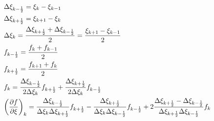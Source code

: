 \begin{equation*}
    \begin{split}
        &
        \Delta \xi_{k - \frac{1}{2}}
        =
        \xi_{k} - \xi_{k - 1}
        \\
        &
        \Delta \xi_{k + \frac{1}{2}}
        =
        \xi_{k + 1} - \xi_{k}
        \\
        &
        \Delta \xi_{k}
        =
        \frac
            {\Delta \xi_{k + \frac{1}{2}} + \Delta \xi_{k - \frac{1}{2}}}
            {2}
        =
        \frac
            {\xi_{k+1} - \xi_{k-1}}
            {2}
        \\
        &
        f_{k - \frac{1}{2}}
        =
        \frac
            {f_{k} + f_{k - 1}}
            {2}
        \\
        &
        f_{k + \frac{1}{2}}
        =
        \frac
            {f_{k + 1} + f_{k}}
            {2}
        \\
        &
        f_{k}
        =
        \frac
            {\Delta \xi_{k - \frac{1}{2}}}
            {2 \Delta \xi_{k}}
        f_{k + \frac{1}{2}}
        +
        \frac
            {\Delta \xi_{k + \frac{1}{2}}}
            {2 \Delta \xi_{k}}
        f_{k - \frac{1}{2}}
        \\
        &
        {\left(
            \frac
                {\partial f}
                {\partial \xi}
        \right)}_{k}
        =
        \frac
            {\Delta \xi_{k - \frac{1}{2}}}
            {\Delta \xi_{k} \Delta \xi_{k + \frac{1}{2}}}
        f_{k + \frac{1}{2}}
        -
        \frac
            {\Delta \xi_{k + \frac{1}{2}}}
            {\Delta \xi_{k} \Delta \xi_{k - \frac{1}{2}}}
        f_{k - \frac{1}{2}}
        +
        2
        \frac
            {\Delta \xi_{k + \frac{1}{2}} - \Delta \xi_{k - \frac{1}{2}}}
            {\Delta \xi_{k + \frac{1}{2}} \Delta \xi_{k - \frac{1}{2}}}
        f_{k}
    \end{split}
\end{equation*}